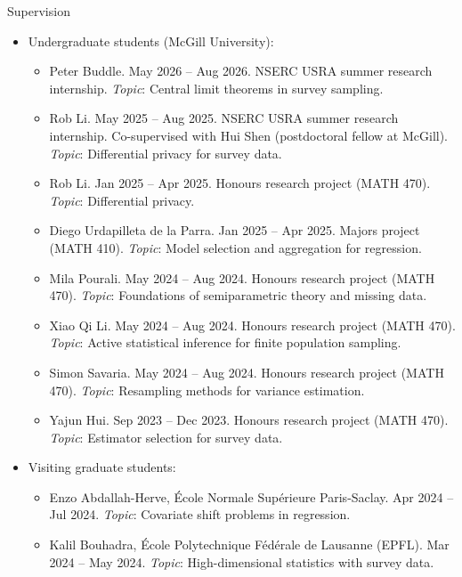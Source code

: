 \documentclass{resume}
\begin{document}
\begin{rSection}{Supervision}
\begin{itemize}
\item Undergraduate students (McGill University):
\begin{itemize}
  \item[--] Peter Buddle. May 2026 -- Aug 2026. NSERC USRA summer research internship. \emph{Topic}: Central limit theorems in survey sampling.
  \item[--] Rob Li. May 2025 -- Aug 2025. NSERC USRA summer research internship. Co-supervised with Hui Shen (postdoctoral fellow at McGill). \emph{Topic}: Differential privacy for survey data.
  \item[--] Rob Li. Jan 2025 -- Apr 2025. Honours research project (MATH 470). \emph{Topic}: Differential privacy.
  \item[--] Diego Urdapilleta de la Parra. Jan 2025 -- Apr 2025. Majors project (MATH 410). \emph{Topic}: Model selection and aggregation for regression.
  \item[--] Mila Pourali. May 2024 -- Aug 2024. Honours research project (MATH 470). \emph{Topic}: Foundations of semiparametric theory and missing data.
  \item[--] Xiao Qi Li. May 2024 -- Aug 2024. Honours research project (MATH 470). \emph{Topic}: Active statistical inference for finite population sampling.
  \item[--] Simon Savaria. May 2024 -- Aug 2024. Honours research project (MATH 470). \emph{Topic}: Resampling methods for variance estimation.
  \item[--] Yajun Hui. Sep 2023 -- Dec 2023. Honours research project (MATH 470). \emph{Topic}: Estimator selection for survey data.
\end{itemize}

\item Visiting graduate students:
\begin{itemize}
  \item[--] Enzo Abdallah-Herve, École Normale Supérieure Paris-Saclay. Apr 2024 -- Jul 2024. \emph{Topic}: Covariate shift problems in regression.
  \item[--] Kalil Bouhadra, École Polytechnique Fédérale de Lausanne (EPFL). Mar 2024 -- May 2024. \emph{Topic}: High-dimensional statistics with survey data.
\end{itemize}
\end{itemize}
\end{rSection}
\end{document}
